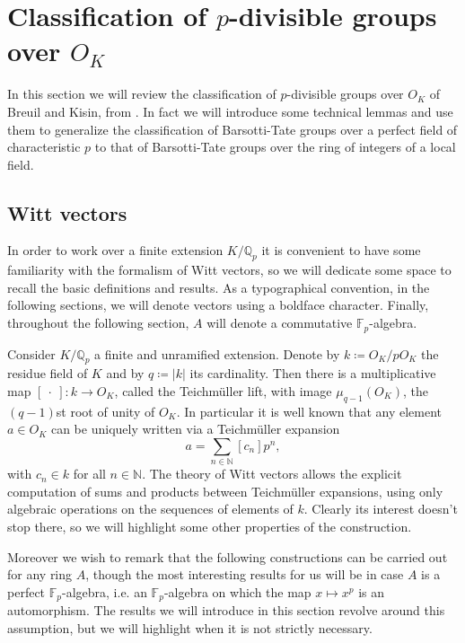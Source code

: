 \section{Classification of \texorpdfstring{$p$}{p}-divisible groups
	over \texorpdfstring{$O_{ K }$}{the ring of integers of K}}
In this section we will review the classification
of $p$-divisible groups over $O_K$ of Breuil and Kisin, from \cite[Appendix A]{Kisin}.
In fact we will introduce some technical lemmas and use them to
generalize the classification of Barsotti-Tate groups over a perfect field
of characteristic $p$
to that of Barsotti-Tate groups over the ring of integers of a local field.



\subsection{Witt vectors}
In order to work over a finite extension $K/\mathbb{Q}_p$ it is convenient to
have some familiarity with the formalism of Witt vectors, so we will dedicate some 
space to recall the basic definitions and results.
As a typographical convention, in the following sections, we will
denote vectors using a boldface character.
Finally, throughout the following section, \(A\)
will denote a commutative \(\mathbb{F}_{ p }\)-algebra.


\begin{rem}[Motivation]
	Consider $K/\mathbb{Q}_p$ a finite and unramified extension.
	Denote by $k \coloneqq O_K/pO_K$ the residue field of $K$ and by $q \coloneqq \left| k \right|$
	its cardinality.
	Then there is a multiplicative map $[\ \cdot \ ]\colon k \to O_K$,
	called the Teichmüller lift, with image $\mu_{q-1}(O_K)$,
	the $(q-1)$st root of unity of $O_K$.
	In particular it is well known that any element $a \in O_K$
	can be uniquely written via a Teichmüller expansion
	\begin{equation*}
		a = \sum_{n \in \mathbb{N}} [c_n] p^n
	,\end{equation*}
	with $c_n \in k$ for all $n \in \mathbb{N}$.
	The theory of Witt vectors allows the explicit computation of sums and
	products between Teichmüller expansions, using only
	algebraic operations on the sequences of elements of $k$.
	Clearly its interest doesn't stop there, so we will highlight some 
	other properties of the construction.

	Moreover we wish to remark that the following constructions
	can be carried out for any ring $A$, though the most interesting
	results for us will be in case $A$ is a perfect $\mathbb{F}_p$-algebra,
	i.e. an $\mathbb{F}_p$-algebra on which the map $x \mapsto x^p$
	is an automorphism.
	The results we will introduce in this section
	revolve around this assumption, but we will highlight when
	it is not strictly necessary.
\end{rem}


